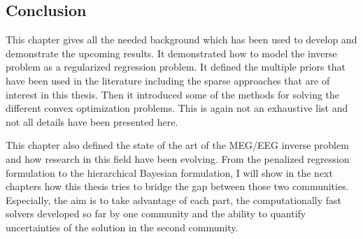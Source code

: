 \subsection{Conclusion}
This chapter gives all the needed background which has been used to develop and demonstrate the upcoming results. It demonstrated how to model the inverse problem as a regularized regression problem. It defined the multiple priors that have been used in the literature including the sparse approaches that are of interest in this thesis. Then it introduced some of the methods for solving the different convex optimization problems. This is again not an exhaustive list and not all details have been presented here. 

This chapter also defined the state of the art of the MEG/EEG inverse problem and how research in this field have been evolving. From the penalized regression formulation to the hierarchical Bayesian formulation, I will show in the next chapters how this thesis tries to bridge the gap between those two communities. Especially, the aim is to take advantage of each part, the computationally fast solvers developed so far by one community and the ability to quantify uncertainties of the solution in the second community.